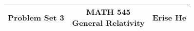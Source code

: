 \documentclass[12pt]{article}
\begin{document}
\thispagestyle{plain}
\vspace{-4ex}  %


\begin{center}
\begin{tabular}{*{3}{c}}
    \parbox[t]{0.3\linewidth}{\centering\textbf{Problem Set 3}}
    & \parbox[t]{0.3\linewidth}{\centering\textbf{MATH 545\\General Relativity}}
    & \parbox[t]{0.3\linewidth}{\centering\textbf{Erise He}}\\[2em]
    \hline
\end{tabular}
\end{center}

\bigskip

\end{document}
